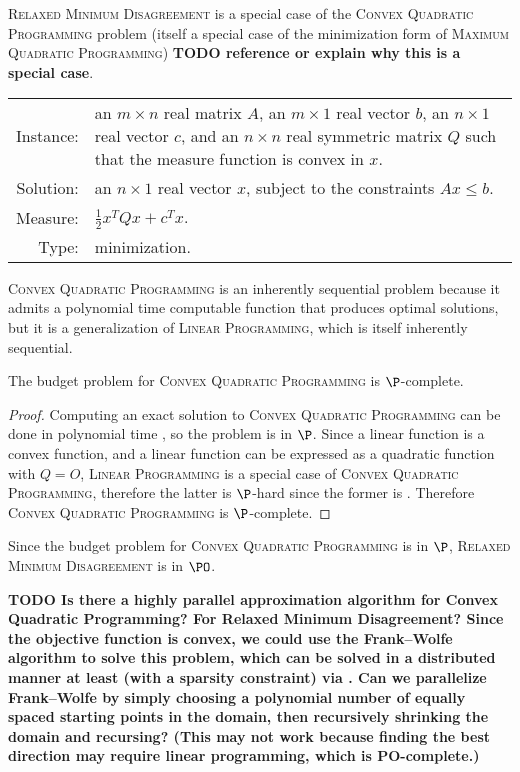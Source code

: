 \documentclass{article}
\newcommand{\todo}[1]{\textbf{TODO #1}}
\newcommand{\1}{\mathbf{1}}
\newcommand{\RMD}{\textsc{Relaxed Minimum Disagreement}}
\newcommand{\MQP}{\textsc{Maximum Quadratic Programming}}
\newcommand{\CQP}{\textsc{Convex Quadratic Programming}}
\begin{document}
\RMD{} is a special case of the \CQP{} problem (itself a special case of the minimization form of \MQP{}) \todo{reference or explain why this is a special case}.

\begin{definition}[\CQP{}]
  \mbox{}

  \begin{tabular}{r p{9.3cm}}
    Instance: & an $m \times n$ real matrix $A$, an $m \times 1$ real vector $b$, an $n \times 1$ real vector $c$, and an $n \times n$ real symmetric matrix $Q$ such that the measure function is convex in $x$. \\
    Solution: & an $n \times 1$ real vector $x$, subject to the constraints $Ax \leq b$. \\
    Measure: & $\frac{1}{2} x^T Q x + c^T x$. \\
    Type: & minimization.
  \end{tabular}
\end{definition}

\CQP{} is an inherently sequential problem because it admits a polynomial time computable function that produces optimal solutions, but it is a generalization of \textsc{Linear Programming}, which is itself inherently sequential.

\begin{theorem}
  The budget problem for \CQP{} is $\P$-complete.
\end{theorem}
\begin{proof}
  Computing an exact solution to \CQP{} can be done in polynomial time \autocite{gl90}, so the problem is in $\P$.
  Since a linear function is a convex function, and a linear function can be expressed as a quadratic function with $Q = O$, \textsc{Linear Programming} is a special case of \CQP{}, therefore the latter is $\P$-hard since the former is \autocite{ghr95}.
  Therefore \CQP{} is $\P$-complete.
\end{proof}

Since the budget problem for \CQP{} is in $\P$, \RMD{} is in $\PO$.

\todo{
  Is there a highly parallel approximation algorithm for Convex Quadratic Programming?
  For Relaxed Minimum Disagreement?
  Since the objective function is convex, we could use the Frank--Wolfe algorithm to solve this problem, which can be solved in a distributed manner at least (with a sparsity constraint) via \autocite{blgbs15}.
  Can we parallelize Frank--Wolfe by simply choosing a polynomial number of equally spaced starting points in the domain, then recursively shrinking the domain and recursing?
  (This may not work because finding the best direction may require linear programming, which is PO-complete.)}
\end{document}
